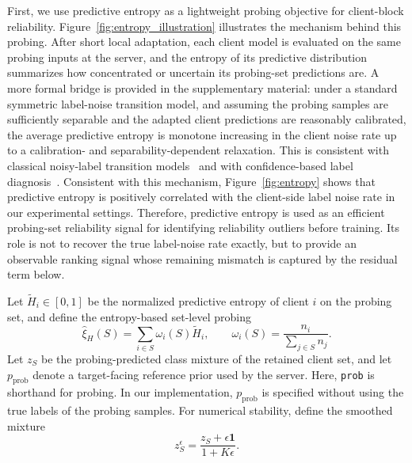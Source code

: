 ﻿\documentclass[conference]{IEEEtran}
\theoremstyle{definition}
\theoremstyle{remark}
\begin{document}
First, we use predictive entropy as a lightweight probing objective for client-block reliability. 
Figure~\ref{fig:entropy_illustration} illustrates the mechanism behind this probing.
After short local adaptation, each client model is evaluated on the same probing inputs at the server, and the entropy of its predictive distribution summarizes how concentrated or uncertain its probing-set predictions are.
A more formal bridge is provided in the supplementary material: under a standard symmetric label-noise transition model, and assuming the probing samples are sufficiently separable and the adapted client predictions are reasonably calibrated, the average predictive entropy is monotone increasing in the client noise rate up to a calibration- and separability-dependent relaxation.
This is consistent with classical noisy-label transition models~\cite{natarajan2013learning,patrini2017loss} and with confidence-based label diagnosis~\cite{northcutt2021confident,guo2017calibration}.
Consistent with this mechanism, Figure~\ref{fig:entropy} shows that predictive entropy is positively correlated with the client-side label noise rate in our experimental settings. 
Therefore, predictive entropy is used as an efficient probing-set reliability signal for identifying reliability outliers before training.
Its role is not to recover the true label-noise rate exactly, but to provide an observable ranking signal whose remaining mismatch is captured by the residual term below.

Let $\widetilde H_i\in[0,1]$ be the normalized predictive entropy of client $i$ on the probing set, and define the entropy-based set-level probing
\begin{equation}
\label{eq:entropy_probing_set}
\widehat{\xi}_{H}(S)
=
\sum_{i\in S}
\omega_i(S)\widetilde H_i,
\qquad
\omega_i(S)=\frac{n_i}{\sum_{j\in S}n_j}.
\end{equation}
Let $z_S$ be the probing-predicted class mixture of the retained client set, and let $p_{\mathrm{prob}}$ denote a target-facing reference prior used by the server. Here, \texttt{prob} is shorthand for probing.
In our implementation, $p_{\mathrm{prob}}$ is specified without using the true labels of the probing samples.
For numerical stability, define the smoothed mixture
\begin{equation}
\label{eq:smoothed_probing_mixture}
z_S^\epsilon
=
\frac{z_S+\epsilon \mathbf 1}{1+K\epsilon}.
\end{equation}
\end{document}
